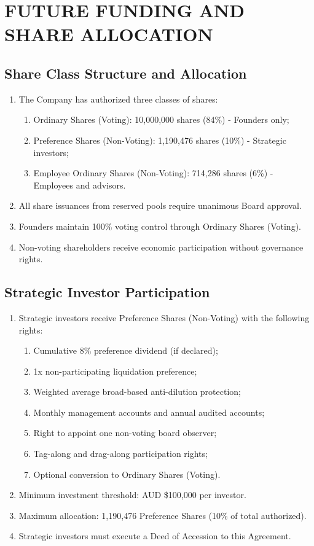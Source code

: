 \section{FUTURE FUNDING AND SHARE ALLOCATION}

\subsection{Share Class Structure and Allocation}
\begin{enumerate}[label=(\alph*)]
\item The Company has authorized three classes of shares:
    \begin{enumerate}[label=(\roman*)]
    \item Ordinary Shares (Voting): 10,000,000 shares (84\%) - Founders only;
    \item Preference Shares (Non-Voting): 1,190,476 shares (10\%) - Strategic investors;
    \item Employee Ordinary Shares (Non-Voting): 714,286 shares (6\%) - Employees and advisors.
    \end{enumerate}
\item All share issuances from reserved pools require unanimous Board approval.
\item Founders maintain 100\% voting control through Ordinary Shares (Voting).
\item Non-voting shareholders receive economic participation without governance rights.
\end{enumerate}

\subsection{Strategic Investor Participation}
\begin{enumerate}[label=(\alph*)]
\item Strategic investors receive Preference Shares (Non-Voting) with the following rights:
    \begin{enumerate}[label=(\roman*)]
    \item Cumulative 8\% preference dividend (if declared);
    \item 1x non-participating liquidation preference;
    \item Weighted average broad-based anti-dilution protection;
    \item Monthly management accounts and annual audited accounts;
    \item Right to appoint one non-voting board observer;
    \item Tag-along and drag-along participation rights;
    \item Optional conversion to Ordinary Shares (Voting).
    \end{enumerate}
\item Minimum investment threshold: AUD \$100,000 per investor.
\item Maximum allocation: 1,190,476 Preference Shares (10\% of total authorized).
\item Strategic investors must execute a Deed of Accession to this Agreement.
\end{enumerate}

